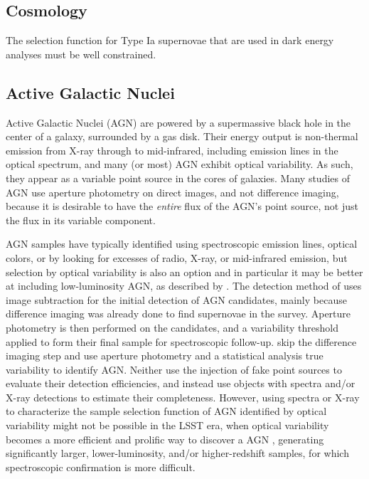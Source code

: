\subsection{Cosmology}\label{ssec:sci_cosmo}

The selection function for Type Ia supernovae that are used in dark energy analyses must be well constrained.


\subsection{Active Galactic Nuclei}\label{ssec:sci_agn}

Active Galactic Nuclei (AGN) are powered by a supermassive black hole in the center of a galaxy, surrounded by a gas disk.
Their energy output is non-thermal emission from X-ray through to mid-infrared, including emission lines in the optical spectrum, and many (or most) AGN exhibit optical variability.
As such, they appear as a variable point source in the cores of galaxies.
Many studies of AGN use aperture photometry on direct images, and not difference imaging, because it is desirable to have the {\it entire} flux of the AGN's point source, not just the flux in its variable component.

AGN samples have typically identified using spectroscopic emission lines, optical colors, or by looking for excesses of radio, X-ray, or mid-infrared emission, but selection by optical variability is also an option and in particular it may be better at including low-luminosity AGN, as described by \cite[e.g.,][]{2008A&A...488...73T,2010ApJ...723..737V}.
The detection method of \cite{2008A&A...488...73T} uses image subtraction for the initial detection of AGN candidates, mainly because difference imaging was already done to find supernovae in the survey.
Aperture photometry is then performed on the candidates, and a variability threshold applied to form their final sample for spectroscopic follow-up.
\cite{2010ApJ...723..737V} skip the difference imaging step and use aperture photometry and a statistical analysis true variability to identify AGN.
Neither use the injection of fake point sources to evaluate their detection efficiencies, and instead use objects with spectra and/or X-ray detections to estimate their completeness.
However, using spectra or X-ray to characterize the sample selection function of AGN identified by optical variability might not be possible in the LSST era, when optical variability becomes a more efficient and prolific way to discover a AGN \cite[e.g.,][]{2014ApJ...782...37C}, generating significantly larger, lower-luminosity, and/or higher-redshift samples, for which spectroscopic confirmation is more difficult.

